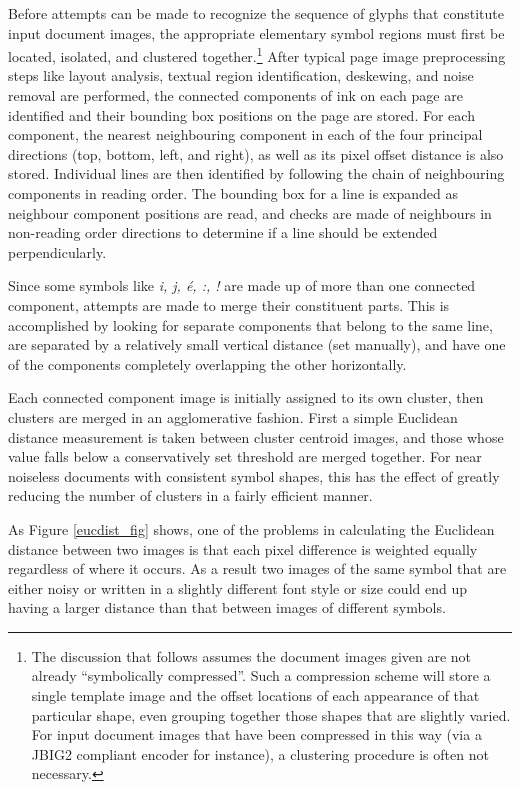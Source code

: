 \documentclass[times, 10pt,twocolumn]{article}
\begin{document}

Before attempts can be made to recognize the sequence of glyphs that 
constitute input document images, the appropriate elementary symbol regions 
must first be located, isolated, and clustered together.\footnote{The
discussion that follows assumes the document images given are not
already ``symbolically compressed''. Such a compression scheme will
store a single template image and the offset locations of each
appearance of that particular shape, even grouping together
those shapes that are slightly varied.  For input document images that
have been compressed in this way (via a JBIG2 compliant encoder 
for instance), a clustering procedure is often not necessary.}
After typical page image preprocessing steps like layout analysis, textual
region identification, deskewing, and noise removal are performed, the
connected components of ink on each page are identified and their bounding box
positions on the page are stored.  For each component, the nearest neighbouring
component in each of the four principal directions (top, bottom, left, and
right), as well as its pixel offset distance is also stored.  Individual lines
are then identified by following the chain of neighbouring components in
reading order.  The bounding box for a line is expanded as neighbour
component positions are read, and checks are made of neighbours in non-reading
order directions to determine if a line should be extended perpendicularly.

Since some symbols like {\em i, j, \'{e}, :, !} are made up of more than one
connected component, attempts are made to merge their constituent parts.  This
is accomplished by looking for separate components that belong to the same
line, are separated by a relatively small vertical distance (set manually), and
have one of the components completely overlapping the other horizontally.

Each connected component image is initially assigned to its own cluster, then
clusters are merged in an agglomerative fashion.  First a simple Euclidean
distance measurement is taken between cluster centroid images, and those whose
value falls below a conservatively set threshold are merged together.  For near
noiseless documents with consistent symbol shapes, this has the effect of 
greatly reducing the number of clusters in a fairly efficient manner.

As Figure \ref{eucdist_fig} shows, one of the problems in calculating the 
Euclidean distance between two images is that each pixel difference is weighted 
equally regardless of where it occurs.  As a result two images of the same 
symbol that are either noisy or written in a slightly different font style or 
size could end up having a larger distance than that between images of 
different symbols.
\end{document}
